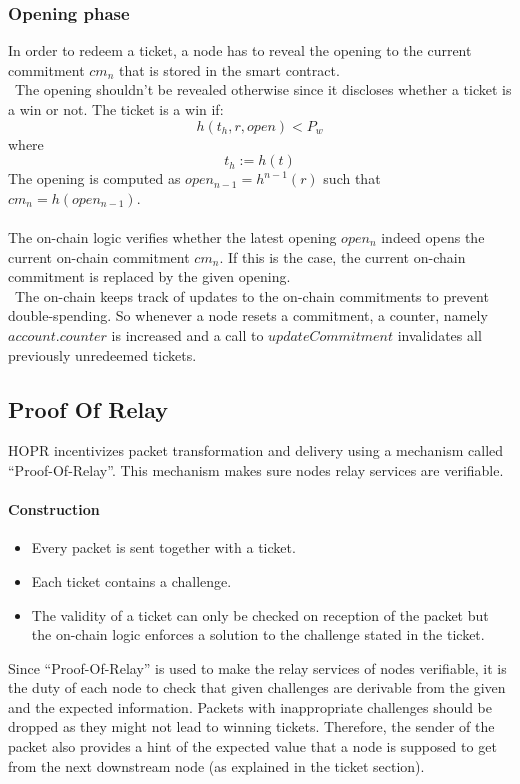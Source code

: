 \subsubsection{Opening phase}
In order to redeem a ticket, a node has to reveal the opening to the current commitment $cm_n$ that is stored in the smart contract. 
\\~The opening shouldn’t be revealed otherwise since it discloses whether a ticket is a win or not.
The ticket is a win if: $$h( t_h, r, open ) <P_w$$ where $$t_h:=h(t)$$
The opening is computed as $open_{n-1} = h^{n-1}(r)$ such that $cm_n=h( open_{n-1})$. 
\\~\\The on-chain logic verifies whether the latest opening $open_n$ indeed opens the current on-chain commitment $cm_n$. 
If this is the case, the current on-chain commitment is replaced by the given opening. 
\\~The on-chain keeps track of updates to the on-chain commitments to prevent double-spending. 
So whenever a node resets a commitment, a counter, namely $account.counter$ is increased and a call to $updateCommitment$ invalidates all previously unredeemed tickets.



\subsection{Proof Of Relay}

HOPR incentivizes packet transformation and delivery using a mechanism called “Proof-Of-Relay”.
This mechanism makes sure nodes relay services are verifiable.
\paragraph{Construction}
\begin{itemize}
    \item Every packet is sent together with a ticket.
    \item Each ticket contains a challenge.
    \item The validity of a ticket can only be checked on reception of the packet but the on-chain logic enforces a solution to the challenge stated in the ticket.
\end{itemize}

Since “Proof-Of-Relay” is used to make the relay services of nodes verifiable, it is the duty of each node to check that given challenges are derivable from the given and the expected information.
Packets with inappropriate challenges should be dropped as they might not lead to winning tickets.
Therefore, the sender of the packet also provides a hint of the expected value that a node is supposed to get from the next downstream node (as explained in the ticket section).

